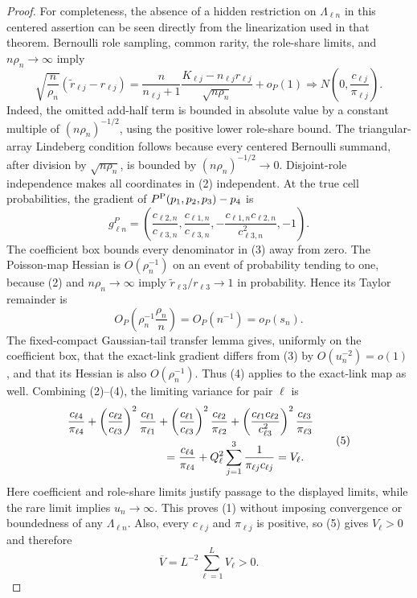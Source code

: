 \documentclass{article}
\begin{document}
\begin{proof}
For completeness, the absence of a hidden restriction on
\(\Lambda_{\ell n}\) in this centered assertion can be seen directly from the
linearization used in that theorem.  Bernoulli role sampling, common rarity,
the role-share limits, and \(n\rho_n\to\infty\) imply
\[
 \sqrt{\frac n{\rho_n}}
   (\widetilde r_{\ell j}-r_{\ell j})
 =\frac{n}{n_{\ell j}+1}
   \frac{K_{\ell j}-n_{\ell j}r_{\ell j}}{\sqrt{n\rho_n}}
   +o_{P}(1)
 \Rightarrow N\!\left(0,\frac{c_{\ell j}}{\pi_{\ell j}}\right).
 \tag{2}
\]
Indeed, the omitted add-half term is bounded in absolute value by a constant
multiple of \((n\rho_n)^{-1/2}\), using the positive lower role-share bound.
The triangular-array Lindeberg condition follows because every centered
Bernoulli summand, after division by \(\sqrt{n\rho_n}\), is bounded by
\((n\rho_n)^{-1/2}\to0\).  Disjoint-role independence makes all coordinates in
(2) independent.  At the true cell probabilities, the gradient of
\(P^{\rm P}(p_1,p_2,p_3)-p_4\) is
\[
 g_{\ell n}^{P}
 =\left(
   \frac{c_{\ell2,n}}{c_{\ell3,n}},
   \frac{c_{\ell1,n}}{c_{\ell3,n}},
   -\frac{c_{\ell1,n}c_{\ell2,n}}{c_{\ell3,n}^{2}},
   -1
 \right).
 \tag{3}
\]
The coefficient box bounds every denominator in (3) away from zero.  The
Poisson-map Hessian is \(O(\rho_n^{-1})\) on an event of probability tending
to one, because (2) and \(n\rho_n\to\infty\) imply
\(\widetilde r_{\ell3}/r_{\ell3}\to1\) in probability.  Hence its Taylor
remainder is
\[
 O_P\!\left(\rho_n^{-1}\frac{\rho_n}{n}\right)
   =O_P(n^{-1})=o_P(s_n).
 \tag{4}
\]
The fixed-compact Gaussian-tail transfer lemma gives, uniformly on the
coefficient box, that the exact-link gradient differs from (3) by
\(O(u_n^{-2})=o(1)\), and that its Hessian is also
\(O(\rho_n^{-1})\).  Thus (4) applies to the exact-link map as well.  Combining
(2)--(4), the limiting variance for pair \(\ell\) is
\[
 \begin{aligned}
 &\frac{c_{\ell4}}{\pi_{\ell4}}
 +\left(\frac{c_{\ell2}}{c_{\ell3}}\right)^2
    \frac{c_{\ell1}}{\pi_{\ell1}}
 +\left(\frac{c_{\ell1}}{c_{\ell3}}\right)^2
    \frac{c_{\ell2}}{\pi_{\ell2}}
 +\left(\frac{c_{\ell1}c_{\ell2}}{c_{\ell3}^{2}}\right)^2
    \frac{c_{\ell3}}{\pi_{\ell3}} \\
 &\hspace{30mm}
 =\frac{c_{\ell4}}{\pi_{\ell4}}
   +Q_\ell^2\sum_{j=1}^{3}\frac{1}{\pi_{\ell j}c_{\ell j}}
 =V_\ell.
 \end{aligned}
 \tag{5}
\]
Here coefficient and role-share limits justify passage to the displayed
limits, while the rare limit implies \(u_n\to\infty\).  This proves (1)
without imposing convergence or boundedness of any \(\Lambda_{\ell n}\).
Also, every \(c_{\ell j}\) and \(\pi_{\ell j}\) is positive, so (5) gives
\(V_\ell>0\) and therefore
\[
 \overline V=L^{-2}\sum_{\ell=1}^{L}V_\ell>0.
 \tag{6}
\]


\end{proof}
\end{document}
